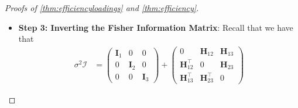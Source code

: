 \documentclass[10pt]{article}
\newcommand{\0}{{\mathbf{0}}}
\newcommand{\1}{{\mathbf{1}}}
\newcommand{\E}{{\mathbf{E}}}
\newcommand{\U}{{\mathbf{U}}}
\renewcommand{\t}{^{\top}}
\renewcommand{\E}{\mathbb{E}}
\newcommand{\del}{\partial}
\renewcommand{\hat}{\widehat}
\renewcommand{\hat}{\widehat}
\begin{document}
\begin{proof}[Proofs of \cref{thm:efficiencyloadings} and \cref{thm:efficiency}]
\begin{itemize}
Finally, we note that from \eqref{eq:Hidentity} that
\begin{align*}
\sigma^2 \E \Bigg[  \frac{\del }{\del (\U_1)_{l_1 a_1}}&\log f( \mathcal{\hat T}; \U_1, \U_2, \U_3, \mathcal{C} ) \frac{\del }{\del (\U_1)_{l_2 a_2}}\log f( \mathcal{\hat T}; \U_1, \U_2, \U_3, \mathcal{C} ) \Bigg] \\
&=  \sum_{i_3} \bigg(\sum_{b,c} \mathcal{C}_{a_1 bc} (\U_2)_{l_2 b} (\U_3)_{i_3 c} \bigg) \bigg( \sum_{a,c} \mathcal{C}_{a b_1 c} (\U_1)_{l_1 a} (\U_3 )_{i_3 c} \bigg).
\end{align*}
Note that
\begin{align*}
    \sum_{b,c} \mathcal{C}_{a_1bc} (\U_2)_{l_2 b} (\U_3)_{i_3 c} %
    &= \sum_{b,c} (\U_2)_{l_2 b} (\U_3)_{i_3 c} \bigg( \sum_{j_1j_2j_3} \mathcal{T}_{j_1j_2j_3} (\U_1)_{j_1a_1} (\U_2)_{j_2 b} (\U_3)_{j_3c} \bigg) \\
    &= \sum_{b,c} (\U_2)_{l_2 b} (\U_3)_{i_3 c} \bigg( \U_1\t \mathbf{T}_1 (\U_2 \otimes \U_3)\bigg)_{a_1,(b,c)} \\
    &= \bigg( \U_1\t \mathbf{T}_1 (\U_2 \otimes \U_3) (\U_2 \otimes \U_3)\t \bigg)_{a_1,(l_2,i_3)} \\
    &= \bigg( \mathbf{\Lambda}_1 \mathbf{V}_1\t \bigg)_{a_1,(l_2,i_3)} \\
    &= (\mathbf{\Lambda}_1)_{a_1} \big( \mathbf{V}_1\big)_{(l_2-1)p_3 + i_3, a_1}.
\end{align*}
By a similar argument,
\begin{align*}
    \bigg( \sum_{a,c} \mathcal{C}_{a b_1 c} (\U_1)_{l_1 a} (\U_3 )_{i_3 c} \bigg) &= (\mathbf{\Lambda}_2)_{b_1} \big( \mathbf{V}_2 \big)_{(l_1 - 1)p_2 + i_3}.
\end{align*}
Therefore,
\begin{align}
    \sum_{i_3} &\bigg(\sum_{b,c} \mathcal{C}_{a_1 bc} (\U_2)_{l_2 b} (\U_3)_{i_3 c} \bigg) \bigg( \sum_{a,c} \mathcal{C}_{a b_1 c} (\U_1)_{l_1 a} (\U_3 )_{i_3 c} \bigg) \nonumber \\
    &= \sum_{i_3}(\mathbf{\Lambda}_2)_{b_1} \big( \mathbf{V}_2 \big)_{(l_1 - 1)p_2 + i_3}(\mathbf{\Lambda}_1)_{a_1} \big( \mathbf{V}_1\big)_{(l_2-1)p_3 + i_3, a_1}, \label{hdef}
\end{align}
with appropriate replacements for different modes. 
\item \textbf{Step 3: Inverting the Fisher Information Matrix}:
Recall that we have that
\begin{align*}
    \sigma^2 \mathcal{I} &= \begin{pmatrix} \mathbf{I}_1 & 0 & 0 \\ 0 &\mathbf{I}_2 & 0 \\ 0 & 0 &\mathbf{I}_3 \end{pmatrix} + \begin{pmatrix} 0 & \mathbf{H}_{12} & \mathbf{H}_{13} \\ \mathbf{H}_{12}\t & 0 & \mathbf{H}_{23} \\ \mathbf{H}_{13}\t & \mathbf{H}_{23}\t & 0

\end{pmatrix}
\end{align*}
\end{itemize}
\end{proof}
\end{document}
